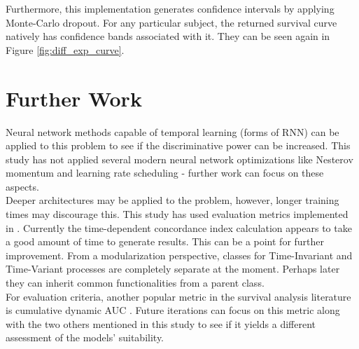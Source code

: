 \documentclass[%
 twocolumn,
 reprint,
 amsmath,amssymb,
 aps,nofootinbib
]{revtex4-2}
\begin{document}
Furthermore, this implementation generates confidence intervals by applying Monte-Carlo dropout. For any particular subject, the returned survival curve natively has confidence bands associated with it. They can be seen again in Figure \ref{fig:diff_exp_curve}.\\



\section{\label{morework}Further Work}
Neural network methods capable of temporal learning (forms of RNN) can be applied to this problem to see if the discriminative power can be increased. This study has not applied several modern neural network optimizations like Nesterov momentum and learning rate scheduling - further work can focus on these aspects. \\

Deeper architectures may be applied to the problem, however, longer training times may discourage this. This study has used evaluation metrics implemented in \cite{kvamme_continuous_2019}. Currently the time-dependent concordance index calculation appears to take a good amount of time to generate results. This can be a point for further improvement. From a modularization perspective, classes for Time-Invariant and Time-Variant processes are completely separate at the moment. Perhaps later they can inherit common functionalities from a parent class.\\

For evaluation criteria, another popular metric in the survival analysis literature is cumulative dynamic AUC \cite{cum_dyn_auc}. Future iterations can focus on this metric along with the two others mentioned in this study to see if it yields a different assessment of the models' suitability.\\
\end{document}
